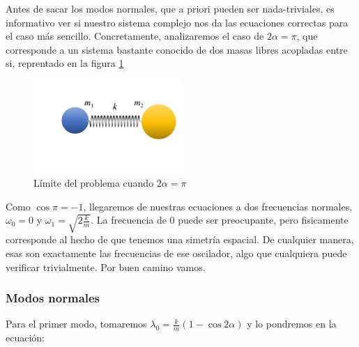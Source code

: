 \documentclass[a4paper,12pt]{article}
\begin{document}
Antes de sacar los modos normales, que a priori pueden ser nada-triviales, es informativo ver si nuestro sistema complejo nos da las ecuaciones correctas para el caso más sencillo. Concretamente, analizaremos el caso de $2\alpha = \pi$, que corresponde a un sistema bastante conocido de dos masas libres acopladas entre si, reprentado en la figura \ref{masamuelle}

\begin{figure}[h]
  \centering
  \caption{Límite del problema cuando $2\alpha = \pi$}
  \label{masamuelle}
  \includegraphics[width=0.5\textwidth]{masamuelle.png}
\end{figure}

Como $\cos{\pi} = -1$, llegaremos de nuestras ecuaciones a dos frecuencias normales, $\omega_0 = 0$ y $\omega_1 = \sqrt{2\frac{k}{m}}$. La frecuencia de 0 puede ser preocupante, pero fisicamente corresponde al hecho de que tenemos una simetría espacial. De cualquier manera, esas son exactamente las frecuencias de ese oscilador, algo que cualquiera puede verificar trivialmente. Por buen camino vamos. 

\subsubsection*{Modos normales}

Para el primer modo, tomaremos $\lambda_0 =  \frac{k}{m} (1 - \cos{2\alpha})$ y lo pondremos en la ecuación:
\end{document}
